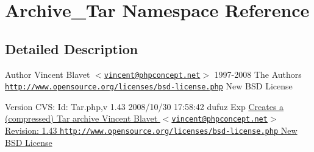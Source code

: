 \hypertarget{namespaceArchive__Tar}{
\section{Archive\_\-Tar Namespace Reference}
\label{namespaceArchive__Tar}
}


\subsection{Detailed Description}
\begin{DoxyAuthor}{Author}
Vincent Blavet $<$\href{mailto:vincent@phpconcept.net}{\tt vincent@phpconcept.net}$>$  1997-\/2008 The Authors  \href{http://www.opensource.org/licenses/bsd-license.php}{\tt http://www.opensource.org/licenses/bsd-\/license.php} New BSD License 
\end{DoxyAuthor}
\begin{DoxyVersion}{Version}
CVS: Id: Tar.php,v 1.43 2008/10/30 17:58:42 dufuz Exp \hyperlink{}{Creates a (compressed) Tar archive   Vincent Blavet $<$\href{mailto:vincent@phpconcept.net}{\tt vincent@phpconcept.net}$>$  Revision: 1.43  \href{http://www.opensource.org/licenses/bsd-license.php}{\tt http://www.opensource.org/licenses/bsd-\/license.php} New BSD License }
\end{DoxyVersion}
